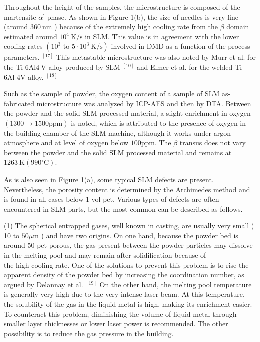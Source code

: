 \documentclass[10pt]{article}
\begin{document}
Throughout the height of the samples, the microstructure is composed of the martensite $\alpha^{\prime}$ phase. As shown in Figure 1(b), the size of needles is very fine (around $360 \mathrm{~nm}$ ) because of the extremely high cooling rate from the $\beta$ domain estimated around $10^{4} \mathrm{~K} / \mathrm{s}$ in SLM. This value is in agreement with the lower cooling rates $\left(10^{3}\right.$ to $\left.5 \cdot 10^{3} \mathrm{~K} / \mathrm{s}\right)$ involved in DMD as a function of the process parameters. ${ }^{[17]}$ This metastable microstructure was also noted by Murr et al. for the Ti-6Al$4 \mathrm{~V}$ alloy produced by SLM ${ }^{[10]}$ and Elmer et al. for the welded Ti-6Al-4V alloy. ${ }^{[18]}$

Such as the sample of powder, the oxygen content of a sample of SLM as-fabricated microstructure was analyzed by ICP-AES and then by DTA. Between the powder and the solid SLM processed material, a slight enrichment in oxygen $(1300 \rightarrow 1500 \mathrm{ppm})$ is noted, which is attributed to the presence of oxygen in the building chamber of the SLM machine, although it works under argon atmosphere and at level of oxygen below $100 \mathrm{ppm}$. The $\beta$ transus does not vary between the powder and the solid SLM processed material and remains at $1263 \mathrm{~K}\left(990{ }^{\circ} \mathrm{C}\right)$.

As is also seen in Figure 1(a), some typical SLM defects are present. Nevertheless, the porosity content is determined by the Archimedes method and is found in all cases below 1 vol pct. Various types of defects are often encountered in SLM parts, but the most common can be described as follows.

(1) The spherical entrapped gases, well known in casting, are usually very small ( 10 to $50 \mu \mathrm{m}$ ) and have two origins. On one hand, because the powder bed is around 50 pct porous, the gas present between the powder particles may dissolve in the melting pool and may remain after solidification because of\\
the high cooling rate. One of the solutions to prevent this problem is to rise the apparent density of the powder bed by increasing the coordination number, as argued by Delannay et al. ${ }^{[19]}$ On the other hand, the melting pool temperature is generally very high due to the very intense laser beam. At this temperature, the solubility of the gas in the liquid metal is high, making its enrichment easier. To counteract this problem, diminishing the volume of liquid metal through smaller layer thicknesses or lower laser power is recommended. The other possibility is to reduce the gas pressure in the building.
\end{document}
